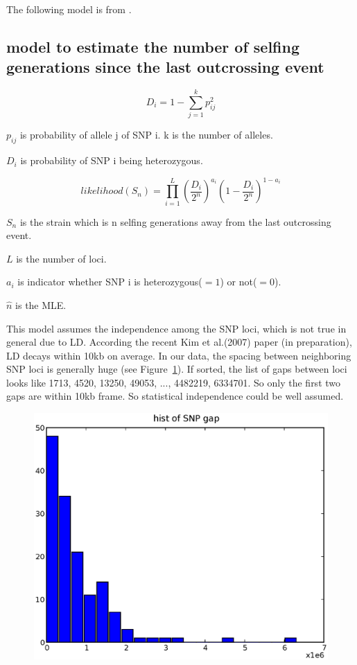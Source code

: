 \documentclass[a4paper,10pt]{article}
\begin{document}
The following model is from \cite{Enjalbert2000}.

\subsection{model to estimate the number of selfing generations since the last outcrossing event}
\begin{equation}
D_i = 1 - \sum_{j=1}^k p_{ij}^2
\end{equation}


$p_{ij}$ is probability of allele j of SNP i. k is the number of alleles.

$D_i$ is probability of SNP i being heterozygous.


\begin{equation}
likelihood(S_n) = \prod_{i=1}^L {(\frac{D_i}{2^n})}^{a_i} {(1-\frac{D_i}{2^n})}^{1-a_i}
\end{equation}

$S_n$ is the strain which is n selfing generations away from the last outcrossing event.

$L$ is the number of loci.

$a_i$ is indicator whether SNP i is heterozygous($=1$) or not($=0$).

$\hat{n}$ is the MLE.

This model assumes the independence among the SNP loci, which is not true in general due to LD. According the recent Kim et al.(2007) paper (in preparation), LD decays within 10kb on average. In our data, the spacing between neighboring SNP loci is generally huge (see Figure~\ref{f7}). If sorted, the list of gaps between loci looks like 1713, 4520, 13250, 49053, ..., 4482219, 6334701. So only the first two gaps are within 10kb frame. So statistical independence could be well assumed.

\begin{figure}
\includegraphics[width=1\textwidth]{figures/snp_locus_gap_hist.eps}
\caption{}\label{f7}
\end{figure}
\end{document}
